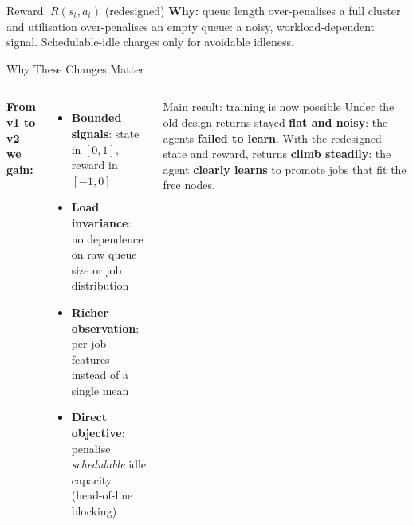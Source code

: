 \begin{frame}{Reward $\;R(s_t, a_t)$ \hfill \small\textcolor{SoftCoral}{(redesigned)}}
  \vspace{0.2em}
  \centering
  \textcolor{DeepBlue}{\textbf{Why:}} queue length over-penalises a full cluster and utilisation over-penalises an empty queue: a noisy, workload-dependent signal. Schedulable-idle charges only for avoidable idleness.
  \vspace{0.4em}
 


\end{frame}


\begin{frame}{Why These Changes Matter}
  \begin{columns}[T]
      \textbf{From v1 to v2 we gain:}
      \begin{itemize}
        \item \textbf{Bounded signals}: state in $[0,1]$, reward in $[-1,0]$
        \item \textbf{Load invariance}: no dependence on raw queue size or job distribution
        \item \textbf{Richer observation}: per-job features instead of a single mean
        \item \textbf{Direct objective}: penalise \emph{schedulable} idle capacity (head-of-line blocking)
      \end{itemize}

      \begin{alertblock}{Main result: training is now possible}
        Under the old design returns stayed \textbf{flat and noisy}: the agents
        \textbf{failed to learn}. With the redesigned state and reward, returns
        \textbf{climb steadily}: the agent \textbf{clearly learns} to promote
        jobs that fit the free nodes.
      \end{alertblock}
  \end{columns}
\end{frame}